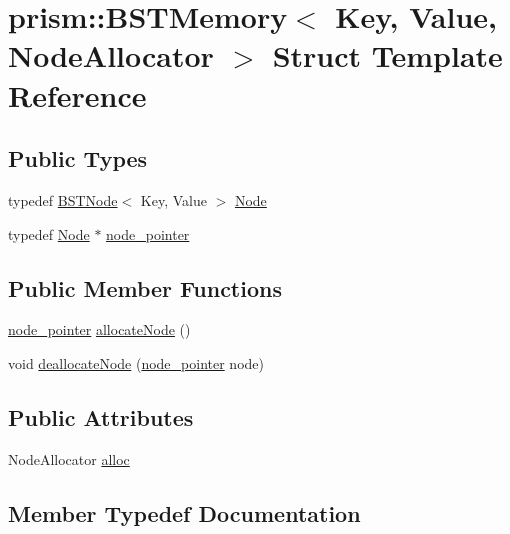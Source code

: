 \hypertarget{structprism_1_1_b_s_t_memory}{}\section{prism\+:\+:B\+S\+T\+Memory$<$ Key, Value, Node\+Allocator $>$ Struct Template Reference}
\label{structprism_1_1_b_s_t_memory}
\subsection*{Public Types}
\begin{DoxyCompactItemize}
\item 
typedef \hyperlink{structprism_1_1_b_s_t_node}{B\+S\+T\+Node}$<$ Key, Value $>$ \hyperlink{structprism_1_1_b_s_t_memory_aa1680fa24f59aef8cb051cf78b110faf}{Node}
\item 
typedef \hyperlink{structprism_1_1_b_s_t_memory_aa1680fa24f59aef8cb051cf78b110faf}{Node} $\ast$ \hyperlink{structprism_1_1_b_s_t_memory_a78f59f5f10249be56ca8b3508486bfc0}{node\+\_\+pointer}
\end{DoxyCompactItemize}
\subsection*{Public Member Functions}
\begin{DoxyCompactItemize}
\item 
\hyperlink{structprism_1_1_b_s_t_memory_a78f59f5f10249be56ca8b3508486bfc0}{node\+\_\+pointer} \hyperlink{structprism_1_1_b_s_t_memory_ad69052ed93777d46b8e760c2e435f6b0}{allocate\+Node} ()
\item 
void \hyperlink{structprism_1_1_b_s_t_memory_a9dfbec756f0704b54256e886ec3d91fc}{deallocate\+Node} (\hyperlink{structprism_1_1_b_s_t_memory_a78f59f5f10249be56ca8b3508486bfc0}{node\+\_\+pointer} node)
\end{DoxyCompactItemize}
\subsection*{Public Attributes}
\begin{DoxyCompactItemize}
\item 
Node\+Allocator \hyperlink{structprism_1_1_b_s_t_memory_a6fd7c2062bd20f0aca58d21ad2a06fc1}{alloc}
\end{DoxyCompactItemize}


\subsection{Member Typedef Documentation}
